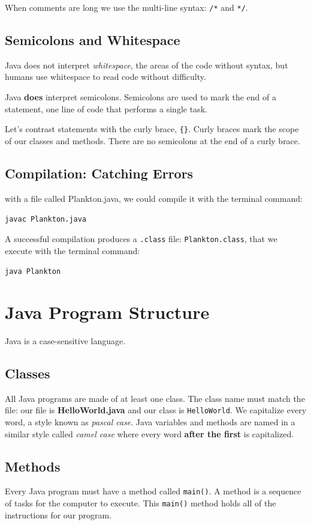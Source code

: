 \documentclass[a4paper, 12pt]{article}
\begin{document}
When comments are long we use the multi-line syntax: \verb|/*| and \verb|*/|.

\subsection{Semicolons and Whitespace}
Java does not interpret \textit{whitespace}, the areas of the code without syntax, but humans use whitespace to read code without difficulty.

Java \textbf{does} interpret semicolons. Semicolons are used to mark the end of a statement, one line of code that performs a single task.

Let's contrast statements with the curly brace, \verb|{}|. Curly braces mark the scope of our classes and methods. There are no semicolons at the end of a curly brace.

\subsection{Compilation: Catching Errors}
with a file called Plankton.java, we could compile it with the terminal command:

\verb|javac Plankton.java|

A successful compilation produces a \verb|.class| file: \verb|Plankton.class|, that we execute with the terminal command:

\verb|java Plankton|


\section{Java Program Structure}
Java is a case-sensitive language.

\subsection{Classes}
All Java programs are made of at least one class. The class name must match the file: our file is \textbf{HelloWorld.java} and our class is \verb|HelloWorld|. We capitalize every word, a style known as \textit{pascal case}. Java variables and methods are named in a similar style called \textit{camel case} where every word \textbf{after the first} is capitalized.

\subsection{Methods}
Every Java program must have a method called \verb|main()|. A method is a sequence of tasks for the computer to execute. This \verb|main()| method holds all of the instructions for our program.
\end{document}
